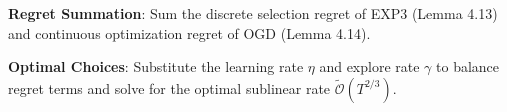 \begin{guideblock}
\item \textbf{Regret Summation}: Sum the discrete selection regret of EXP3 (Lemma 4.13) and continuous optimization regret of OGD (Lemma 4.14).
\item \textbf{Optimal Choices}: Substitute the learning rate $\eta$ and explore rate $\gamma$ to balance regret terms and solve for the optimal sublinear rate $\tilde{\mathcal{O}}(T^{2/3})$.
\end{guideblock}

